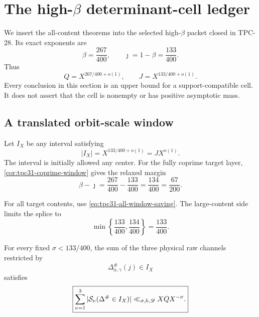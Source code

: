 \section{The high-\texorpdfstring{$\beta$}{beta} determinant-cell ledger}
\label{sec:tpc31-high-beta}

We insert the all-content theorems into the selected high-$\beta$
packet closed in TPC-28.  Its exact exponents are
\begin{equation}
 \beta=\frac{267}{400},
 \qquad
 \jmath=1-\beta=\frac{133}{400}.
 \label{eq:tpc31-high-parameters}
\end{equation}
Thus
\begin{equation}
 Q=X^{267/400+o(1)},
 \qquad
 J=X^{133/400+o(1)}.
 \label{eq:tpc31-high-QJ}
\end{equation}
Every conclusion in this section is an upper bound for a
support-compatible cell.  It does not assert that the cell is
nonempty or has positive asymptotic mass.

\subsection{A translated orbit-scale window}

Let $I_X$ be any interval satisfying
\begin{equation}
 |I_X|=X^{133/400+o(1)}=JX^{o(1)}.
 \label{eq:tpc31-high-J-window}
\end{equation}
The interval is initially allowed any center.  For the fully coprime
target layer, \cref{cor:tpc31-coprime-window} gives the relaxed margin
\begin{equation}
 \beta-\jmath
 =\frac{267}{400}-\frac{133}{400}
 =\frac{134}{400}
 =\frac{67}{200}.
 \label{eq:tpc31-high-coprime-J-window-margin}
\end{equation}

For all target contents, use
\eqref{eq:tpc31-all-window-saving}.  The large-content side limits the
splice to
\begin{equation}
 \min\left\{\frac{133}{400},\frac{134}{400}\right\}
 =\boxed{\frac{133}{400}}.
 \label{eq:tpc31-high-all-J-window-margin}
\end{equation}

\begin{corollary}
\label{cor:tpc31-high-J-window}
For every fixed $\sigma<133/400$, the sum of the three physical raw
channels restricted by
\begin{equation}
 \Delta^\#_{\alpha,\gamma}(j)\in I_X
 \label{eq:tpc31-high-J-window-event}
\end{equation}
satisfies
\begin{equation}
 \boxed{
 \sum_{\nu=1}^3
 |\mathcal S_\nu(\Delta^\#\in I_X)|
 \ll_{\sigma,h,\mathscr D}XQX^{-\sigma}.}
 \label{eq:tpc31-high-J-window-bound}
\end{equation}
\end{corollary}


